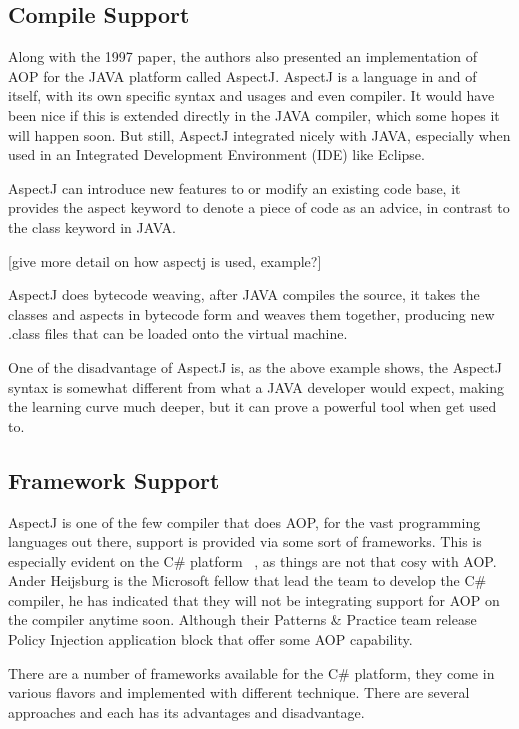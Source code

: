 \subsection{Compile Support}

Along with the 1997 paper, the authors also presented an implementation of AOP for the JAVA platform called AspectJ. AspectJ is a language in and of itself, with its own specific syntax and usages and even compiler. It would have been nice if this is extended directly in the JAVA compiler, which some hopes it will happen soon. But still, AspectJ integrated nicely with JAVA, especially when used in an Integrated Development Environment (IDE) like Eclipse.

AspectJ can introduce new features to or modify an existing code base, it provides the aspect keyword to denote a piece of code as an advice, in contrast to the class keyword in JAVA.

[give more detail on how aspectj is used, example?]

AspectJ does bytecode weaving, after JAVA compiles the source, it takes the classes and aspects in bytecode form and weaves them together, producing new .class files that can be loaded onto the virtual machine.

One of the disadvantage of AspectJ is, as the above example shows, the AspectJ syntax is somewhat different from what a JAVA developer would expect, making the learning curve much deeper, but it can prove a powerful tool when get used to.

\subsection{Framework Support}

AspectJ is one of the few compiler that does AOP, for the vast programming languages out there, support is provided via some sort of frameworks. This is especially evident on the C\# platform ~\cite{aopcs}, as things are not that cosy with AOP. Ander Heijsburg is the Microsoft fellow that lead the team to develop the C\# compiler, he has indicated that they will not be integrating support for AOP on the compiler anytime soon. Although their Patterns \& Practice team release Policy Injection application block that offer some AOP capability.

There are a number of frameworks available for the C\# platform, they come in various flavors and implemented with different technique. There are several approaches and each has its advantages and disadvantage.

